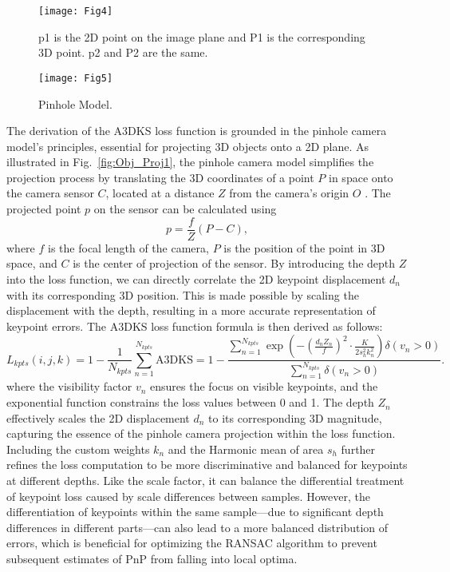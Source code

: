 \documentclass[a4paper,fleqn]{cas-sc}
\begin{document}
\begin{figure}[!htbp]
	\centering
	\texttt{[image: Fig4]} 
	\caption{p1 is the 2D point on the image plane and P1 is the corresponding 3D point. p2 and P2 are the same.}
	\label{fig:A3DKS_illustration}
\end{figure}

\begin{figure}[!htbp]
	\centering
	\texttt{[image: Fig5]}
	\caption{Pinhole Model.}
	\label{fig:pinhole}
\end{figure}

The derivation of the A3DKS loss function is grounded in the pinhole camera model's principles, essential for projecting 3D objects onto a 2D plane. As illustrated in Fig.~\ref{fig:Obj_Proj1}, the pinhole camera model simplifies the projection process by translating the 3D coordinates of a point $P$ in space onto the camera sensor  $C$, located at a distance  $Z$  from the camera's origin $ O $ . The projected point $p$ on the sensor can be calculated using
\begin{equation}
p = \frac{f}{Z}(P - C),
\end{equation}
where $f$ is the focal length of the camera, $P$ is the position of the point in 3D space, and $C$ is the center of projection of the sensor. By introducing the depth $Z$ into the loss function, we can directly correlate the 2D keypoint displacement $d_n$ with its corresponding 3D position. This is made possible by scaling the displacement with the depth, resulting in a more accurate representation of keypoint errors.
The A3DKS loss function formula is then derived as follows:
\begin{equation}
	L_{kpts}(i, j, k) 
    = 1 - \frac{1}{N_{kpts}} \sum\limits_{n=1}^{N_{kpts}} \mathrm{A3DKS}
    = 1 - \frac{\sum\limits_{n=1}^{N_{kpts}} \exp \left( -\left( \frac{d_n Z_n}{f} \right)^2 \cdot \frac{K}{2 s_h^2 k_n^2} \right) \delta(v_n > 0)}{\sum\limits_{n=1}^{N_{kpts}} \delta(v_n > 0)}.
\end{equation}
where the visibility factor $v_n$ ensures the focus on visible keypoints, and the exponential function constrains the loss values between 0 and 1. The depth $Z_n$ effectively scales the 2D displacement $d_n$ to its corresponding 3D magnitude, capturing the essence of the pinhole camera projection within the loss function. Including the custom weights $k_n$ and the Harmonic mean of area $s_h$ further refines the loss computation to be more discriminative and balanced for keypoints at different depths. Like the scale factor, it can balance the differential treatment of keypoint loss caused by scale differences between samples. However, the differentiation of keypoints within the same sample—due to significant depth differences in different parts—can also lead to a more balanced distribution of errors, which is beneficial for optimizing the RANSAC algorithm to prevent subsequent estimates of PnP from falling into local optima.
\end{document}
